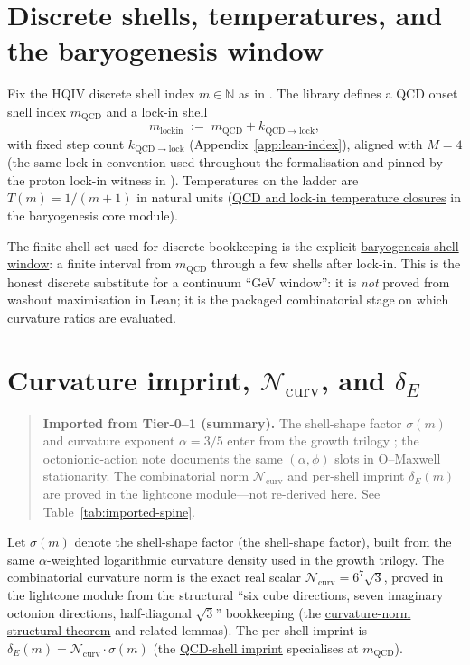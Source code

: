 \documentclass[11pt]{amsart}
\newcommand{\LeanEng}[2]{\hyperref[#1]{#2}}
\newenvironment{summarybox}{%
  \medskip\begin{quote}\small
}{%
  \end{quote}\medskip
}
\begin{document}
\section{Discrete shells, temperatures, and the baryogenesis window}

Fix the HQIV discrete shell index $m\in\mathbb{N}$ as in
\cite{hqiv-so8-paper,hqiv-3d-growth-paper}. The library defines a QCD
onset shell index $m_{\mathrm{QCD}}$ and a lock-in shell
\[
m_{\mathrm{lockin}} \;:=\; m_{\mathrm{QCD}}+k_{\mathrm{QCD}\to\mathrm{lock}},
\]
with fixed step count $k_{\mathrm{QCD}\to\mathrm{lock}}$ (Appendix~\ref{app:lean-index}),
aligned with $M=4$ (the same lock-in convention used
throughout the formalisation and pinned by the proton lock-in witness in
\cite{hqiv-tuft-sm-lagrangian-paper,hqiv-kirchhoff-paper}). Temperatures on the
ladder are $T(m)=1/(m+1)$ in natural units
(\LeanEng{lean:T-QCD-lockin}{QCD and lock-in temperature closures} in the
baryogenesis core module).

The finite shell set used for discrete bookkeeping is the explicit
\LeanEng{lean:baryogenesis-shells}{baryogenesis shell window}: a finite
interval from $m_{\mathrm{QCD}}$ through a few shells after
lock-in. This is the honest discrete substitute for a continuum ``GeV
window'': it is \emph{not} proved from washout maximisation in Lean; it is
the packaged combinatorial stage on which curvature ratios are evaluated.

\section{Curvature imprint, \(\mathcal{N}_{\mathrm{curv}}\), and \(\delta_E\)}

\begin{summarybox}
\noindent\textbf{Imported from Tier-0--1 (summary).}
The shell-shape factor $\sigma(m)$ and curvature exponent $\alpha=3/5$ enter
from the growth trilogy \cite{hqiv-3d-growth-paper,hqiv-so8-paper}; the
octonionic-action note \cite{hqiv-oct-action-paper} documents the same
$(\alpha,\phi)$ slots in O--Maxwell stationarity. The combinatorial norm
$\mathcal{N}_{\mathrm{curv}}$ and per-shell imprint $\delta_E(m)$ are proved
in the lightcone module---not re-derived here. See
Table~\ref{tab:imported-spine}.
\end{summarybox}

Let $\sigma(m)$ denote the shell-shape factor (the
\LeanEng{lean:shell-shape}{shell-shape factor}), built from the same
$\alpha$-weighted logarithmic curvature density used in the growth trilogy.
The combinatorial curvature norm is the exact real scalar
$\mathcal{N}_{\mathrm{curv}} = 6^{7}\sqrt{3}$, proved in the lightcone
module from the structural ``six cube directions, seven imaginary octonion
directions, half-diagonal $\sqrt{3}$'' bookkeeping (the
\LeanEng{lean:curvature-norm}{curvature-norm structural theorem} and
related lemmas). The per-shell imprint is
$\delta_E(m)=\mathcal{N}_{\mathrm{curv}}\cdot\sigma(m)$ (the
\LeanEng{lean:deltaE-QCD}{QCD-shell imprint} specialises at
$m_{\mathrm{QCD}}$).
\end{document}

